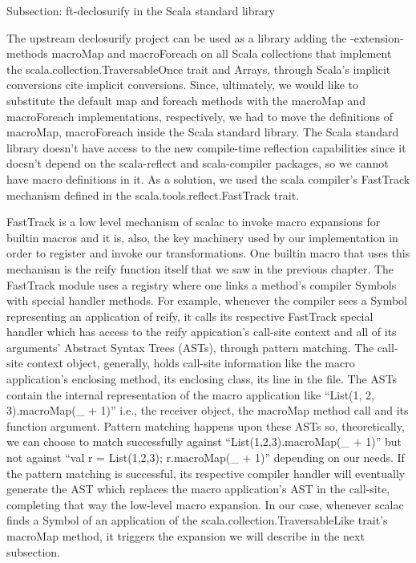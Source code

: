 Subsection: ft-declosurify in the Scala standard library

The upstream declosurify project can be used as a library adding the -extension-
methods macroMap and macroForeach on all Scala collections that implement the
scala.collection.TraversableOnce trait and Arrays, through Scala's implicit
conversions {cite implicit conversions}. Since, ultimately, we would like to
substitute the default map and foreach methods with the macroMap and
macroForeach implementations, respectively, we had to move the definitions
of macroMap, macroForeach inside the Scala standard library. The Scala standard
library doesn't have access to the new compile-time reflection capabilities
since it doesn't depend on the scala-reflect and scala-compiler packages, so we
cannot have macro definitions in it. As a solution, we used the scala compiler's
FastTrack mechanism defined in the scala.tools.reflect.FastTrack trait.

FastTrack is a low level mechanism of scalac to invoke macro
expansions for builtin macros and it is, also, the key machinery used by our
implementation in order to register and invoke our transformations. One builtin
macro that uses this mechanism is the reify function itself that we saw in the
previous chapter. The FastTrack module uses a registry where one links a
method's compiler Symbols with special handler methods. For example, whenever
the compiler sees a Symbol representing an application of reify, it calls its
respective FastTrack special handler which has access to the reify appication's
call-site context and all of  its arguments' Abstract Syntax Trees (ASTs),
through pattern matching. The call-site context object, generally, holds
call-site information like the macro application's enclosing method, its
enclosing class, its line in the file. The ASTs contain the internal
representation of the macro application like ``List(1, 2, 3).macroMap(_ + 1)''
i.e., the receiver object, the macroMap method call and its function argument.
Pattern matching happens upon these ASTs so, theoretically, we can choose to
match successfully against ``List(1,2,3).macroMap(_ + 1)'' but not against ``val
r = List(1,2,3); r.macroMap(_ + 1)'' depending on our needs. If the pattern
matching is successful, its respective compiler handler will eventually generate
the AST which replaces the macro application's AST in the call-site, completing
that way the low-level macro expansion. In our case, whenever scalac finds a
Symbol of an application of the scala.collection.TraversableLike trait's
macroMap method, it triggers the expansion we will describe in the next
subsection.

